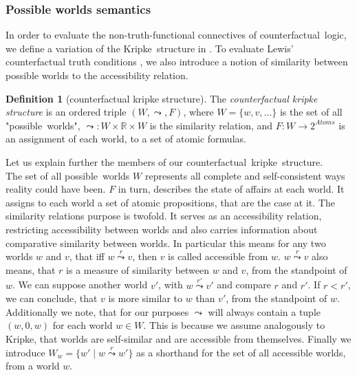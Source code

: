 \documentclass[a4paper,american]{paper}
\theoremstyle{definition}\newtheorem{definition}{Definition}
\begin{document}
\subsubsection{Possible worlds semantics}
In order to evaluate the non-truth-functional connectives of counterfactual~logic, we define a variation of the Kripke~structure in \cite{kripke_modal_logic_1963}. To evaluate Lewis' counterfactual truth conditions \cite{lewis_counterfactuals_1973}, we also introduce a notion of similarity between possible worlds to the accessibility relation.
\begin{definition}[counterfactual kripke structure]
The {\it counterfactual kripke structure} is an ordered triple $(W, \leadsto ,F)$, where $W=\{w,v,...\}$ is the set of all "possible~worlds", $\leadsto \colon W\times \mathbb{R} \times W$ is the similarity relation, and $F \colon W \rightarrow 2^{Atoms}$ is an assignment of each world, to a set of atomic formulas.
\end{definition}
\noindent Let us explain further the members of our counterfactual~kripke~structure.\\
The set of all possible~worlds $W$ represents all complete and self-consistent ways reality could have been. $F$ in turn, describes the state of affairs at each world. It assigns to each world a set of atomic propositions, that are the case at it. The similarity relations purpose is twofold. It serves as an accessibility relation, restricting accessibility between worlds and also carries information about comparative similarity between worlds. In particular this means for any two worlds $w$ and $v$, that iff $w\overset{r}{\leadsto} v$, then $v$ is called accessible from $w$. $w\overset{r}{\leadsto} v$ also means, that $r$ is a measure of similarity between $w$ and $v$, from the standpoint of $w$. We can suppose another world $v'$, with $w\overset{r'}{\leadsto} v'$ and compare $r$ and $r'$. If $r < r'$, we can conclude, that $v$ is more similar to $w$ than $v'$, from the standpoint of $w$. Additionally we note, that for our purposes $\leadsto$ will always contain a tuple $(w, 0, w)$ for each world $w\in W$. This is because we assume analogously to Kripke, that worlds are self-similar and are accessible from themselves. Finally we introduce $W_w = \{w'\mid w \overset{r}{\leadsto} w'\}$ as a shorthand for the set of all accessible worlds, from a world $w$.
\newpage
\end{document}
